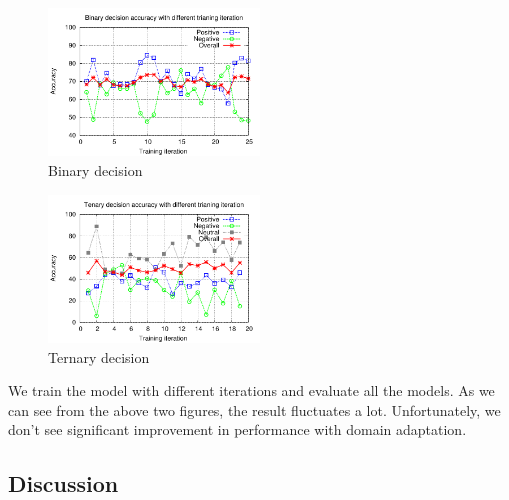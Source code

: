 \begin{itemize}
\begin{figure}[H]
\begin{center}
\includegraphics[width = 0.5\textwidth]{pic/model_2b.pdf}
\caption{Binary decision }
\end{center}
\end{figure}

\begin{figure}[H]
\begin{center}
\includegraphics[width = 0.5\textwidth]{pic/model_3c.pdf}
\caption{Ternary decision }
\end{center}
\end{figure}

We train the model with different iterations and evaluate all the models. As we can see from the above two figures, the result fluctuates a lot. Unfortunately, we don't see significant improvement in performance with domain adaptation.  
\end{itemize}


\subsection{Discussion}
